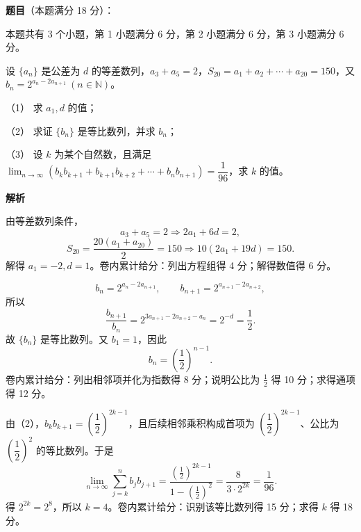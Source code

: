 \begin{answer}

\textbf{题目}（本题满分 18 分）：

本题共有 3 个小题，第 1 小题满分 6 分，第 2 小题满分 6 分，第 3 小题满分 6 分。

设 $\{a_n\}$ 是公差为 $d$ 的等差数列，$a_3+a_5=2$，$S_{20}=a_1+a_2+\cdots+a_{20}=150$，又 $b_n=2^{a_n-2a_{n+1}}\ (n\in\mathbb N)$。

（1） 求 $a_1,d$ 的值；

（2） 求证 $\{b_n\}$ 是等比数列，并求 $b_n$；

（3） 设 $k$ 为某个自然数，且满足 $\displaystyle\lim_{n\to\infty}(b_kb_{k+1}+b_{k+1}b_{k+2}+\cdots+b_nb_{n+1})=\dfrac1{96}$，求 $k$ 的值。

\textbf{解析}


由等差数列条件，
\nopagebreak[4]
\[
a_3+a_5=2\Rightarrow 2a_1+6d=2,
\]
\nopagebreak[4]
\[
S_{20}=\frac{20(a_1+a_{20})}{2}=150
\Rightarrow 10(2a_1+19d)=150.
\]
解得 $a_1=-2,d=1$。卷内累计给分：列出方程组得 4 分；解得数值得 6 分。


\nopagebreak[4]
\[
b_n=2^{a_n-2a_{n+1}},\qquad b_{n+1}=2^{a_{n+1}-2a_{n+2}},
\]
所以
\nopagebreak[4]
\[
\frac{b_{n+1}}{b_n}=2^{3a_{n+1}-2a_{n+2}-a_n}=2^{-d}=\frac12.
\]
故 $\{b_n\}$ 是等比数列。又 $b_1=1$，因此
\nopagebreak[4]
\[
b_n=\left(\frac12\right)^{n-1}.
\]
卷内累计给分：列出相邻项并化为指数得 8 分；说明公比为 $\frac12$ 得 10 分；求得通项得 12 分。


由（2），$b_kb_{k+1}=(\dfrac12)^{2k-1}$，且后续相邻乘积构成首项为 $(\dfrac12)^{2k-1}$、公比为 $(\dfrac12)^2$ 的等比数列。于是
\nopagebreak[4]
\[
\lim_{n\to\infty}\sum_{j=k}^{n}b_jb_{j+1}
=\frac{(\frac12)^{2k-1}}{1-(\frac12)^2}
=\frac{8}{3\cdot2^{2k}}=\frac1{96}.
\]
得 $2^{2k}=2^8$，所以 $k=4$。卷内累计给分：识别该等比数列得 15 分；求得 $k$ 得 18 分。




\end{answer}
